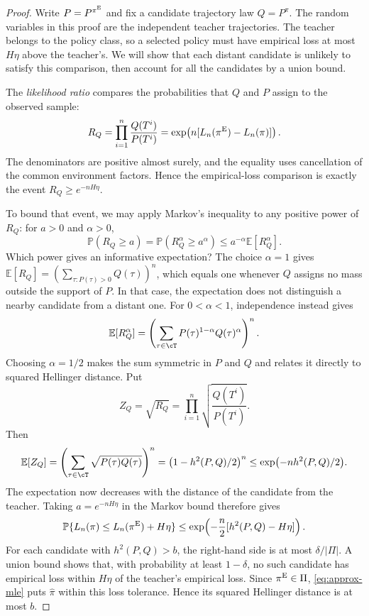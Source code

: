 \documentclass[11pt,twoside]{article}
\newcommand{\E}{\mathbb E}
\renewcommand{\P}{\mathbb P}
\theoremstyle{definition}
\theoremstyle{remark}
\begin{document}
\begin{proof}
Write $P=P^{\pi^{\rm E}}$ and fix a candidate trajectory law $Q=P^\pi$.
The random variables in this proof are the independent teacher trajectories.
The teacher belongs to the policy class, so a selected policy must have
empirical loss at most $H\eta$ above the teacher's. We will show that each
distant candidate is unlikely to satisfy this comparison, then account
for all the candidates by a union bound.

The \emph{likelihood ratio} compares the probabilities that $Q$ and $P$
assign to the observed sample:
\[
 R_Q=\prod_{i=1}^n\frac{Q(T^i)}{P(T^i)}
 =\exp\!\left(n[L_n(\pi^{\rm E})-L_n(\pi)]\right).
\]
The denominators are positive almost surely, and the equality uses
cancellation of the common environment factors. Hence the empirical-loss
comparison is exactly the event $R_Q\ge e^{-nH\eta}$.

To bound that event, we may apply Markov's inequality to any positive power
of $R_Q$: for $a>0$ and $\alpha>0$,
\[
 \P(R_Q\ge a)=\P(R_Q^\alpha\ge a^\alpha)
 \le a^{-\alpha}\E[R_Q^\alpha].
\]
Which power gives an informative expectation? The choice $\alpha=1$ gives
$\E[R_Q]=(\sum_{\tau:P(\tau)>0}Q(\tau))^n$, which equals one whenever
$Q$ assigns no mass outside the support of $P$. In that case, the expectation
does not distinguish a nearby candidate from a distant one.
For $0<\alpha<1$, independence instead gives
\[
 \E[R_Q^\alpha]
 =\left(\sum_{\tau\in\cT}P(\tau)^{1-\alpha}Q(\tau)^\alpha\right)^n.
\]
Choosing $\alpha=1/2$ makes the sum symmetric in $P$ and $Q$ and relates it
directly to squared Hellinger distance. Put
\[
 Z_Q=\sqrt{R_Q}=\prod_{i=1}^n\sqrt{\frac{Q(T^i)}{P(T^i)}}.
\]
Then
\begin{equation}
 \E[Z_Q]
 =\left(\sum_{\tau\in\cT}\sqrt{P(\tau)Q(\tau)}\right)^n
 =\bigl(1-h^2(P,Q)/2\bigr)^n
 \le \exp\bigl(-nh^2(P,Q)/2\bigr).
 \label{eq:affinity}
\end{equation}
The expectation now decreases with the distance of the candidate from the
teacher. Taking $a=e^{-nH\eta}$ in the Markov bound therefore gives
\begin{equation}
 \P\{L_n(\pi)\le L_n(\pi^{\rm E})+H\eta\}
 \le \exp\!\left(-\frac n2[h^2(P,Q)-H\eta]\right).
 \label{eq:bad-likelihood}
\end{equation}
For each candidate with $h^2(P,Q)>b$, the right-hand side is at most
$\delta/|\Pi|$. A union bound shows that, with probability at least
$1-\delta$, no such candidate has empirical loss within $H\eta$ of the
teacher's empirical loss. Since $\pi^{\rm E}\in\Pi$,
\cref{eq:approx-mle} puts $\widehat\pi$ within this loss tolerance.
Hence its squared Hellinger distance is at most $b$.
\end{proof}
\end{document}
